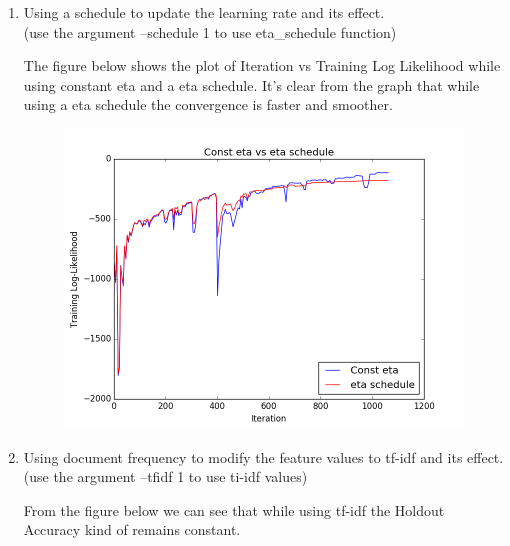 \documentclass{article}
\begin{document}
\begin{enumerate}
\item
Using a schedule to update the learning rate and its effect.\\
(use the argument --schedule 1 to use eta\_schedule function)\bigskip 

The figure below shows the plot of Iteration vs Training Log Likelihood while using constant eta and a eta schedule. It's clear from the graph that while using a eta schedule the convergence is faster and smoother.

\begin{figure}[h]
  \centering
  \begin{minipage}[b]{0.6\textwidth}
    \includegraphics[width=\textwidth]{images/eta.png}
  \end{minipage}
\end{figure}

\item 
Using document frequency to modify the feature values to tf-idf and its effect.\\
(use the argument --tfidf 1 to use ti-idf values)

From the figure below we can see that while using tf-idf the Holdout Accuracy kind of remains constant.


\end{enumerate}
\end{document}
